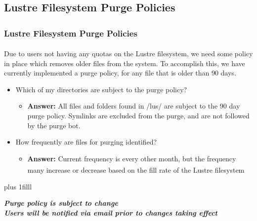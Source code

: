 \documentclass[t,hyperref={pdfpagelabels=false}]{beamer}
\newcommand{\ctilde}{{\fontfamily{ptm}\selectfont\texttildelow}}
\newcommand{\regtrademark}{\fontsize{5}{6}\selectfont \textsuperscript{\textregistered}}
\newcommand{\btVFill}{\vskip0pt plus 1filll}
\newcommand{\lustre}{Lustre{\regtrademark}}
\begin{document}
\subsection{Lustre Filesystem Purge Policies}
\begin{frame}
\frametitle{{\lustre} Filesystem Purge Policies}
Due to users not having any quotas on the {\lustre} filesystem, we need some policy in place which removes older files from the system.  To accomplish this, we have currently implemented a purge policy, for any file that is older than 90 days.
\begin{itemize}
 \item Which of my directories are subject to the purge policy?
   \begin{itemize}
   \item \textbf{Answer:} All files and folders found in \ctilde/lus/ are subject to the 90 day purge policy.  Symlinks are excluded from the purge, and are not followed by the purge bot.  
   \end{itemize}
\item How frequently are files for purging identified?
   \begin{itemize}
   \item \textbf{Answer:} Current frequency is every other month, but the frequency many increase or decrease based on the fill rate of the {\lustre} filesystem 
	\end{itemize}
\end{itemize}
\btVFill
\begin{center}
\footnotesize \textbf{\emph{Purge policy is subject to change~\\Users will be notified via email prior to changes taking effect}}
\end{center}

\end{frame}
\end{document}
